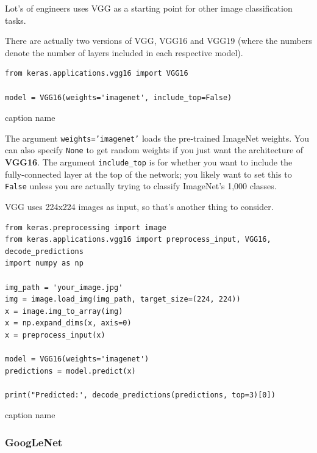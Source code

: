 \documentclass[11pt, a4paper]{article}
\begin{document}
Lot's of engineers uses VGG as a starting point for other image classification tasks. 


There are actually two versions of VGG, VGG16 and VGG19 (where the numbers denote the number of layers included in each respective model).


\begin{listing}
\begin{verbatim}
from keras.applications.vgg16 import VGG16

model = VGG16(weights='imagenet', include_top=False)
\end{verbatim}
\caption{caption name}
\label{lst:caption_name}
\end{listing}


The argument \texttt{weights='imagenet'} loads the pre-trained ImageNet weights. You can also specify \texttt{None} to get random weights if you just want the architecture of \textbf{VGG16}. The argument \texttt{include\_top} is for whether you want to include the fully-connected layer at the top of the network; you likely want to set this to \texttt{False} unless you are actually trying to classify ImageNet's 1,000 classes.

VGG uses 224x224 images as input, so that's another thing to consider.






\begin{listing}
\begin{verbatim}
from keras.preprocessing import image
from keras.applications.vgg16 import preprocess_input, VGG16, decode_predictions
import numpy as np

img_path = 'your_image.jpg'
img = image.load_img(img_path, target_size=(224, 224))
x = image.img_to_array(img)
x = np.expand_dims(x, axis=0)
x = preprocess_input(x)

model = VGG16(weights='imagenet')
predictions = model.predict(x)

print("Predicted:', decode_predictions(predictions, top=3)[0])

\end{verbatim}
\caption{caption name}
\label{lst:caption_name}
\end{listing}






\subsubsection{GoogLeNet}%
\label{ssub:googlenet}
\end{document}
